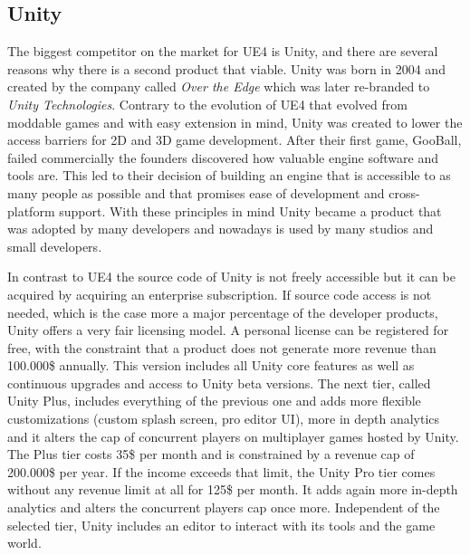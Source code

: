 \subsection{Unity}

The biggest competitor on the market for \ac{UE4} is Unity, and there are several reasons why there is a second product that viable. Unity was born in 2004 and created by the company called \textit{Over the Edge} which was later re-branded to \textit{Unity Technologies}. Contrary to the evolution of \ac{UE4} that evolved from moddable games and with easy extension in mind, Unity was created to lower the access barriers for 2D and 3D game development. After their first game, GooBall, failed commercially the founders discovered how valuable engine software and tools are. This led to their decision of building an engine that is accessible to as many people as possible and that promises ease of development and cross-platform support. With these principles in mind Unity became a product that was adopted by many developers and nowadays is used by many studios and small developers.

In contrast to \ac{UE4} the source code of Unity is not freely accessible but it can be acquired by acquiring an enterprise subscription. If source code access is not needed, which is the case more a major percentage of the developer products, Unity offers a very fair licensing model. A personal license can be registered for free, with the constraint that a product does not generate more revenue than 100.000\$ annually. This version includes all Unity core features as well as continuous upgrades and access to Unity beta versions. The next tier, called Unity Plus, includes everything of the previous one and adds more flexible customizations (custom splash screen, pro editor UI), more in depth analytics and it alters the cap of concurrent players on multiplayer games hosted by Unity. The Plus tier costs 35\$ per month and is constrained by a revenue cap of 200.000\$ per year. If the income exceeds that limit, the Unity Pro tier comes without any revenue limit at all for 125\$ per month. It adds again more in-depth analytics and alters the concurrent players cap once more. Independent of the selected tier, Unity includes an editor to interact with its tools and the game world. 

\clearpage

